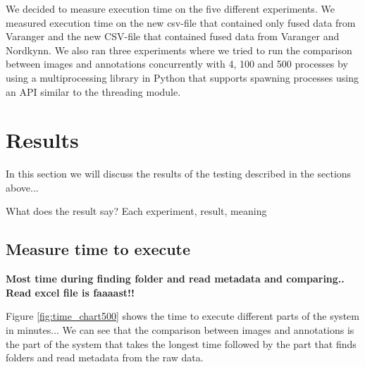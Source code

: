 \documentclass[USenglish]{uit-thesis}
\begin{document}
We decided to measure execution time on the five different experiments. We measured execution time on the new csv-file that contained only fused data from Varanger and the new CSV-file that contained fused data from Varanger and Nordkynn. We also ran three experiments where we tried to run the comparison between images and annotations concurrently with 4, 100 and 500 processes by using a multiprocessing library in Python that supports spawning processes using an API similar to the threading module.

\section{Results}
In this section we will discuss the results of the testing described in the sections above...

What does the result say?
Each experiment, result, meaning

\subsection{Measure time to execute}
\textbf{Most time during finding folder and read metadata and comparing.. Read excel file is faaaast!!}


Figure \ref{fig:time_chart500} shows the time to execute different parts of the system in minutes... We can see that the comparison between images and annotations is the part of the system that takes the longest time followed by the part that finds folders and read metadata from the raw data.

\end{document}
